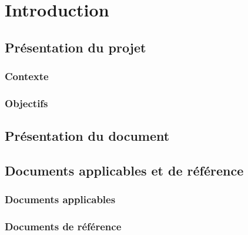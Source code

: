 \section*{Introduction}

    \subsection{Présentation du projet}
        \subsubsection{Contexte}
        \subsubsection{Objectifs}
    \subsection{Présentation du document}
    \subsection{Documents applicables et de référence}
        \subsubsection{Documents applicables}
        \subsubsection{Documents de référence}

